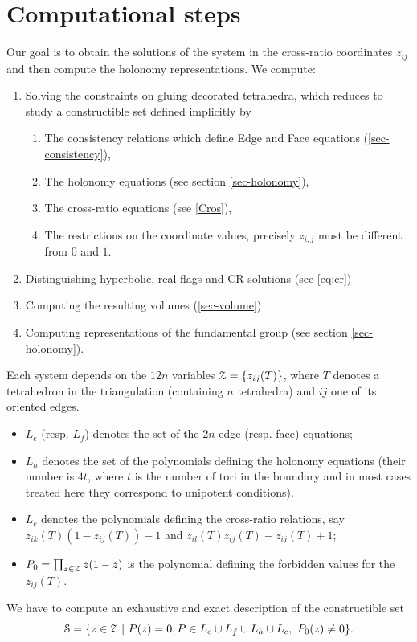\section{Computational steps}\label{tools}

Our goal is to obtain the solutions of the system in the cross-ratio coordinates $z_{ij}$ and then
compute the holonomy representations.  We compute:
\begin{enumerate}
\item Solving the constraints on gluing decorated tetrahedra, which reduces to study a constructible set defined implicitly by
\begin{enumerate}
\item The consistency relations which define Edge and Face equations (\ref{sec-consistency}),
\item The holonomy equations (see section \ref{sec-holonomy}),
\item The cross-ratio equations (see \ref{Cros}),
\item The restrictions on the coordinate values, precisely $z_{i,j}$ must be different from $0$ and $1$.
\end{enumerate}
\item Distinguishing hyperbolic, real flags and CR solutions (see \ref{eq:cr})
\item Computing the resulting volumes (\ref{sec-volume})
\item Computing representations of the fundamental group (see section \ref{sec-holonomy}).
\end{enumerate}
Each system depends on the $12n$ variables
${\mathcal Z} = \{ z_{ij}(T)\}$, where $T$ denotes a tetrahedron in the triangulation (containing $n$ tetrahedra) and ${ij}$ one of its oriented edges.
\begin{itemize}
\item[---] $L_e$ (resp. $L_f$) denotes the set of the $2n$ edge (resp. face) equations;
\item[---] $L_h$ denotes the set of the polynomials defining the holonomy equations (their number is $4 t$, where $t$ is the number of tori in the boundary and in most cases treated here they correspond to unipotent conditions).
\item[---] $L_c$ denotes the polynomials defining the cross-ratio relations, say $z_{ik}(T)(1-z_{ij}(T))-1$ and $z_{il}(T)z_{ij}(T)-z_{ij}(T)+1$;
\item[---] $P_0 = \prod_{z \in {\mathcal Z}} z(1-z)$ is the polynomial defining the forbidden values for the $z_{ij}(T)$.
\end{itemize}
We have to compute an exhaustive and exact description of the constructible set
$$
\cS = \{ z \in \cZ \ | \ P(z)=0, P \in L_e \cup L_f \cup L_h \cup L_c, \ P_0(z) \not = 0\}.
$$

